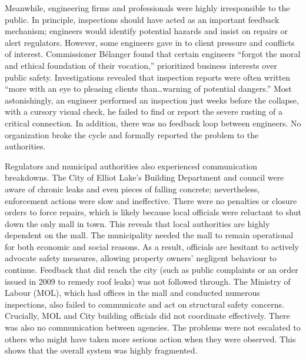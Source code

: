 \documentclass[12pt]{article}
\begin{document}
Meanwhile, engineering firms and professionals were highly irresponsible to the public. In principle, inspections should have acted as an important feedback mechanism; engineers would identify potential hazards and insist on repairs or alert regulators. However, some engineers gave in to client pressure and conflicts of interest. Commissioner Bélanger found that certain engineers “forgot the moral and ethical foundation of their vocation,” prioritized business interests over public safety. Investigations revealed that inspection reports were often written “more with an eye to pleasing clients than…warning of potential dangers.” Most astonishingly, an engineer performed an inspection just weeks before the collapse, with a cursory visual check, he failed to find or report the severe rusting of a critical connection. In addition, there was no feedback loop between engineers. No organization broke the cycle and formally reported the problem to the authorities.

Regulators and municipal authorities also experienced communication breakdowns. The City of Elliot Lake’s Building Department and council were aware of chronic leaks and even pieces of falling concrete; nevertheless, enforcement actions were slow and ineffective. There were no penalties or closure orders to force repairs, which is likely because local officials were reluctant to shut down the only mall in town. This reveals that local authorities are highly dependent on the mall. The municipality needed the mall to remain operational for both economic and social reasons. As a result, officials are hesitant to actively advocate safety measures, allowing property owners' negligent behaviour to continue. Feedback that did reach the city (such as public complaints or an order issued in 2009 to remedy roof leaks) was not followed through. The Ministry of Labour (MOL), which had offices in the mall and conducted numerous inspections, also failed to communicate and act on structural safety concerns. Crucially, MOL and City building officials did not coordinate effectively. There was also no communication between agencies. The problems were not escalated to others who might have taken more serious action when they were observed. This shows that the overall system was highly fragmented.
\end{document}
